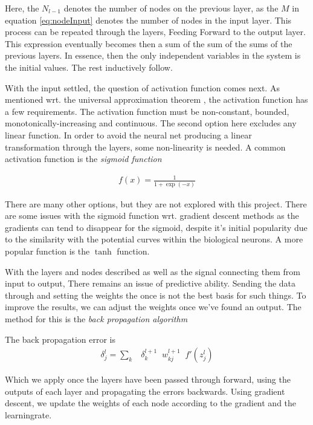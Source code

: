 \documentclass[10pt]{article}
\begin{document}
Here, the $N_{l-1}$ denotes the number of nodes on the previous layer, as the
$M$ in equation \ref{eq:nodeInput} denotes the number of nodes in the input
layer. This process can be repeated through the layers, Feeding Forward to the
output layer. This expression eventually becomes then a sum of the sum of the
sums of the previous layers. In essence, then the only independent variables in
the system is the initial values. The rest inductively follow. 

With the input settled, the question of activation function comes next. As
mentioned wrt. the universal approximation theorem , the activation function
has a few requirements. The activation function must be non-constant, bounded,
monotonically-increasing and continuous. The second option here excludes any
linear function. In order to avoid the neural net producing a linear
transformation through the layers, some non-linearity is needed. A common
activation function is the \emph{sigmoid function}

\begin{align}
	f(x) = \frac{1}{1 + \exp(-x)}
	\label{eq:sigmoid}
\end{align}

There are many other options, but they are not explored with this project.
There are some issues with the sigmoid function wrt. gradient descent methods
as the gradients can tend to disappear for the sigmoid, despite it's initial
popularity due to the similarity with the potential curves within the
biological neurons. A more popular function is the $\tanh$ function. 

With the layers and nodes described as well as the signal connecting them from
input to output, There remains an issue of predictive ability. Sending the data
through and setting the weights the once is not the best basis for such things.
To improve the results, we can adjust the weights once we've found an output.
The method for this is the \emph{back propagation algorithm}

The back propagation error is
\begin{align}
	\delta^l_j = \sum_k \;\;\;\delta^{l+1}_k \;\; w^{l+1}_{kj} \;\; f'(z^l_j)
\end{align}

Which we apply once the layers have been passed through forward, using the
outputs of each layer and propagating the errors backwards. Using gradient
descent, we update the weights of each node according to the gradient and the
learningrate. 
\end{document}
